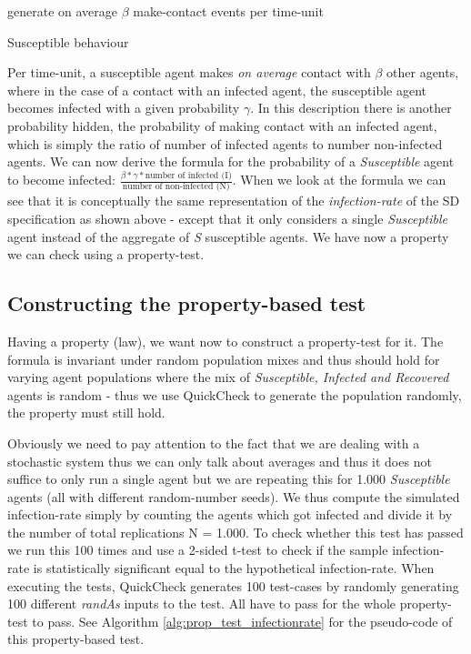 \begin{algorithm}
generate on average $\beta$ make-contact events per time-unit\; 
\caption{Susceptible behaviour}
\end{algorithm}

Per time-unit, a susceptible agent makes \textit{on average} contact with $\beta$ other agents, where in the case of a contact with an infected agent, the susceptible agent becomes infected with a given probability $\gamma$. In this description there is another probability hidden, the probability of making contact with an infected agent, which is simply the ratio of number of infected agents to number non-infected agents. We can now derive the formula for the probability of a \textit{Susceptible} agent to become infected: $\frac{\beta * \gamma * \text{number of infected (I)}}{\text{number of non-infected (N)}}$. When we look at the formula we can see that it is conceptually the same representation of the \textit{infection-rate} of the SD specification as shown above - except that it only considers a single \textit{Susceptible} agent instead of the aggregate of \textit{S} susceptible agents. We have now a property we can check using a property-test.

\subsection{Constructing the property-based test}
Having a property (law), we want now to construct a property-test for it. The formula is invariant under random population mixes and thus should hold for varying agent populations where the mix of \textit{Susceptible, Infected and Recovered} agents is random - thus we use QuickCheck to generate the population randomly, the property must still hold.

Obviously we need to pay attention to the fact that we are dealing with a stochastic system thus we can only talk about averages and thus it does not suffice to only run a single agent but we are repeating this for 1.000 \textit{Susceptible} agents (all with different random-number seeds). We thus compute the simulated infection-rate simply by counting the agents which got infected and divide it by the number of total replications N = 1.000. To check whether this test has passed we run this 100 times and use a 2-sided t-test to check if the sample infection-rate is statistically significant equal to the hypothetical infection-rate. When executing the tests, QuickCheck generates 100 test-cases by randomly generating 100 different \textit{randAs} inputs to the test. All have to pass for the whole property-test to pass. See Algorithm \ref{alg:prop_test_infectionrate} for the pseudo-code of this property-based test.

